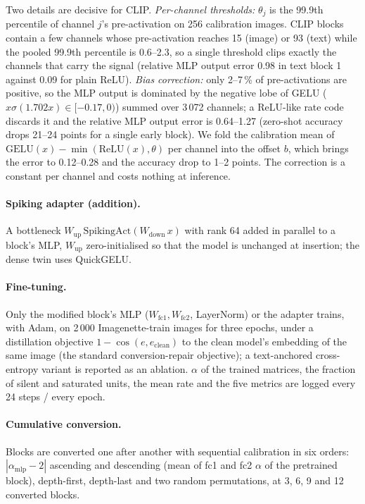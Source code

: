 Two details are decisive for CLIP. \emph{Per-channel thresholds:} $\theta_j$ is the 99.9th percentile of channel $j$'s pre-activation on 256 calibration images. CLIP blocks contain a few channels whose pre-activation reaches 15 (image) or 93 (text) while the pooled 99.9th percentile is 0.6--2.3, so a single threshold clips exactly the channels that carry the signal (relative MLP output error 0.98 in text block 1 against 0.09 for plain ReLU). \emph{Bias correction:} only 2--7\,\% of pre-activations are positive, so the MLP output is dominated by the negative lobe of GELU ($x\sigma(1.702x) \in [-0.17, 0)$) summed over 3\,072 channels; a ReLU-like rate code discards it and the relative MLP output error is 0.64--1.27 (zero-shot accuracy drops 21--24 points for a single early block). We fold the calibration mean of $\mathrm{GELU}(x) - \min(\mathrm{ReLU}(x), \theta)$ per channel into the offset $b$, which brings the error to 0.12--0.28 and the accuracy drop to 1--2 points. The correction is a constant per channel and costs nothing at inference.

\paragraph{Spiking adapter (addition).} A bottleneck $W_{\mathrm{up}}\,\mathrm{SpikingAct}(W_{\mathrm{down}}\, x)$ with rank 64 added in parallel to a block's MLP, $W_{\mathrm{up}}$ zero-initialised so that the model is unchanged at insertion; the dense twin uses QuickGELU.

\paragraph{Fine-tuning.} Only the modified block's MLP ($W_{\mathrm{fc1}}, W_{\mathrm{fc2}}$, LayerNorm) or the adapter trains, with Adam, on 2\,000 Imagenette-train images for three epochs, under a distillation objective $1 - \cos(e, e_{\mathrm{clean}})$ to the clean model's embedding of the same image (the standard conversion-repair objective); a text-anchored cross-entropy variant is reported as an ablation. $\alpha$ of the trained matrices, the fraction of silent and saturated units, the mean rate and the five metrics are logged every 24 steps / every epoch.

\paragraph{Cumulative conversion.} Blocks are converted one after another with sequential calibration in six orders: $|\alpha_{\mathrm{mlp}}-2|$ ascending and descending (mean of fc1 and fc2 $\alpha$ of the pretrained block), depth-first, depth-last and two random permutations, at 3, 6, 9 and 12 converted blocks.

